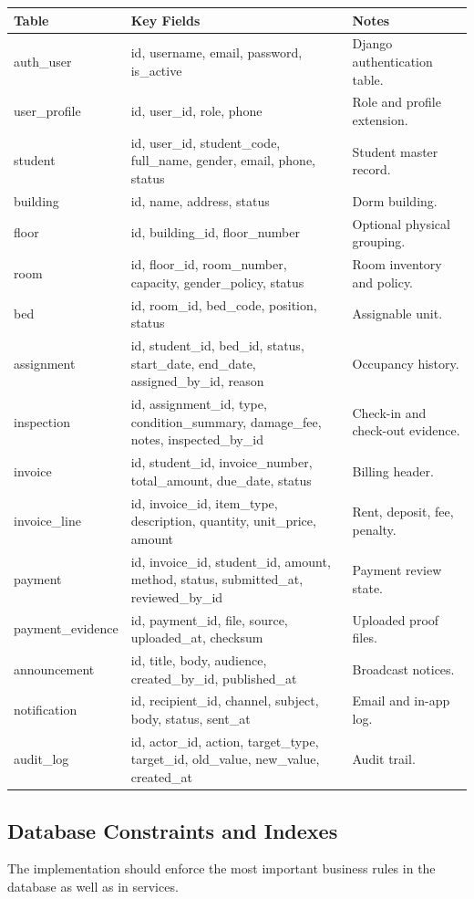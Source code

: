 \documentclass[11pt,a4paper]{article}
\begin{document}
\begin{longtable}{L{0.20\textwidth} L{0.40\textwidth} L{0.27\textwidth}}
\toprule
\textbf{Table} & \textbf{Key Fields} & \textbf{Notes}\\
\midrule
\endhead
auth\_user & id, username, email, password, is\_active & Django authentication table.\\
user\_profile & id, user\_id, role, phone & Role and profile extension.\\
student & id, user\_id, student\_code, full\_name, gender, email, phone, status & Student master record.\\
building & id, name, address, status & Dorm building.\\
floor & id, building\_id, floor\_number & Optional physical grouping.\\
room & id, floor\_id, room\_number, capacity, gender\_policy, status & Room inventory and policy.\\
bed & id, room\_id, bed\_code, position, status & Assignable unit.\\
assignment & id, student\_id, bed\_id, status, start\_date, end\_date, assigned\_by\_id, reason & Occupancy history.\\
inspection & id, assignment\_id, type, condition\_summary, damage\_fee, notes, inspected\_by\_id & Check-in and check-out evidence.\\
invoice & id, student\_id, invoice\_number, total\_amount, due\_date, status & Billing header.\\
invoice\_line & id, invoice\_id, item\_type, description, quantity, unit\_price, amount & Rent, deposit, fee, penalty.\\
payment & id, invoice\_id, student\_id, amount, method, status, submitted\_at, reviewed\_by\_id & Payment review state.\\
payment\_evidence & id, payment\_id, file, source, uploaded\_at, checksum & Uploaded proof files.\\
announcement & id, title, body, audience, created\_by\_id, published\_at & Broadcast notices.\\
notification & id, recipient\_id, channel, subject, body, status, sent\_at & Email and in-app log.\\
audit\_log & id, actor\_id, action, target\_type, target\_id, old\_value, new\_value, created\_at & Audit trail.\\
\bottomrule
\end{longtable}

\subsection{Database Constraints and Indexes}
The implementation should enforce the most important business rules in the database as well as in services.
\end{document}
